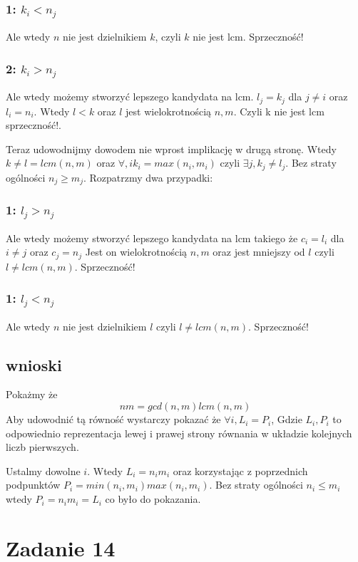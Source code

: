 \documentclass{article}
\begin{document}
\subsubsection*{1: $k_i < n_j$}

Ale wtedy $n$ nie jest dzielnikiem $k$, czyli $k$ nie jest lcm. Sprzeczność! 

\subsubsection*{2: $k_i > n_j$}

Ale wtedy możemy stworzyć lepszego kandydata na lcm. $l_j = k_j$ dla $j \neq i$ oraz $l_i = n_i$. 
Wtedy $l < k$ oraz $l$ jest wielokrotnością $n,m$. Czyli k nie jest lcm sprzeczność!.

Teraz udowodnijmy dowodem nie wprost implikację w drugą stronę. Wtedy $k \neq l = lcm(n,m)$ oraz $\forall, i k_i = max(n_i, m_i)$ czyli $\exists j, k_j \neq l_j$. Bez straty ogólności $n_j \geq m_j$. Rozpatrzmy dwa przypadki:

\subsubsection*{1: $l_j > n_j$}
Ale wtedy możemy stworzyć lepszego kandydata na lcm takiego że $c_i = l_i$ dla $i \neq j$ oraz $c_j = n_j$
Jest on wielokrotnością $n,m$ oraz jest mniejszy od $l$ czyli $l \neq lcm(n,m)$. Sprzeczność!

\subsubsection*{1: $l_j < n_j$}

Ale wtedy $n$ nie jest dzielnikiem $l$ czyli $l \neq lcm(n,m)$. Sprzeczność! 

\subsection*{wnioski}
Pokażmy że $$n m = gcd(n,m) lcm(n,m)$$
Aby udowodnić tą równość wystarczy pokazać że $\forall i, L_i = P_i$, Gdzie $L_i, P_i$ to odpowiednio reprezentacja lewej i prawej strony równania w układzie kolejnych liczb pierwszych.

Ustalmy dowolne $i$. Wtedy $L_i = n_i m_i$ oraz korzystając z poprzednich podpunktów $P_i = min(n_i, m_i) max(n_i, m_i)$. Bez straty ogólności $n_i \leq m_i$ wtedy $P_i = n_i m_i = L_i$ co było do pokazania.

\section*{Zadanie 14}
\end{document}
